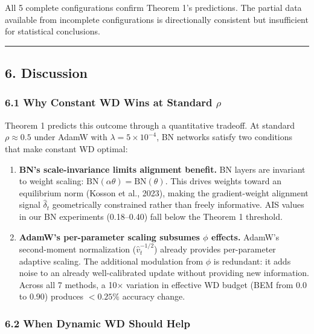 \documentclass[
]{article}
\begin{document}
All 5 complete configurations confirm Theorem 1's predictions. The
partial data available from incomplete configurations is directionally
consistent but insufficient for statistical conclusions.

\begin{center}\rule{0.5\linewidth}{0.5pt}\end{center}

\hypertarget{discussion}{%
\subsection{6. Discussion}\label{discussion}}

\hypertarget{why-constant-wd-wins-at-standard-rho}{%
\subsubsection{\texorpdfstring{6.1 Why Constant WD Wins at Standard
\(\rho\)}{6.1 Why Constant WD Wins at Standard \textbackslash rho}}\label{why-constant-wd-wins-at-standard-rho}}

Theorem 1 predicts this outcome through a quantitative tradeoff. At
standard \(\rho \approx 0.5\) under AdamW with
\(\lambda = 5 \times 10^{-4}\), BN networks satisfy two conditions that
make constant WD optimal:

\begin{enumerate}
\def\labelenumi{\arabic{enumi}.}
\item
  \textbf{BN's scale-invariance limits alignment benefit.} BN layers are
  invariant to weight scaling:
  \(\text{BN}(\alpha \theta) = \text{BN}(\theta)\). This drives weights
  toward an equilibrium norm (Kosson et al., 2023), making the
  gradient-weight alignment signal \(\hat{\delta}_t\) geometrically
  constrained rather than freely informative. AIS values in our BN
  experiments (0.18--0.40) fall below the Theorem 1 threshold.
\item
  \textbf{AdamW's per-parameter scaling subsumes \(\phi\) effects.}
  AdamW's second-moment normalization (\(\hat{v}_t^{-1/2}\)) already
  provides per-parameter adaptive scaling. The additional modulation
  from \(\phi\) is redundant: it adds noise to an already
  well-calibrated update without providing new information. Across all 7
  methods, a 10\(\times\) variation in effective WD budget (BEM from 0.0
  to 0.90) produces \(< 0.25\%\) accuracy change.
\end{enumerate}

\hypertarget{when-dynamic-wd-should-help}{%
\subsubsection{6.2 When Dynamic WD Should
Help}\label{when-dynamic-wd-should-help}}
\end{document}
